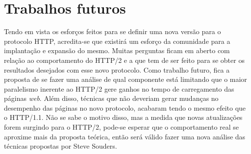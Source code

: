 \section{Trabalhos futuros}
\label{trabalhosfuturos}

Tendo em vista os esforços feitos para se definir uma nova versão para o protocolo HTTP, acredita-se que existirá um esforço da comunidade para a implantação e expansão do mesmo. Muitas perguntas ficam em aberto com relação ao comportamento do HTTP/2 e a que tem de ser feito para se obter os resultados desejados com esse novo protocolo. Como trabalho futuro, fica a proposta de se fazer uma análise de qual componente está limitando que o maior paralelismo inerente ao HTTP/2 gere ganhos no tempo de carregamento das páginas \textit{web}. Além disso, técnicas que não deveriam gerar mudanças no desempenho das páginas no novo protocolo, acabaram tendo o mesmo efeito que o HTTP/1.1. Não se sabe o motivo disso, mas a medida que novas atualizações forem surgindo para o HTTP/2, pode-se esperar que o comportamento real se aproxime mais da proposta teórica, então será válido fazer uma nova análise das técnicas propostas por Steve Souders.